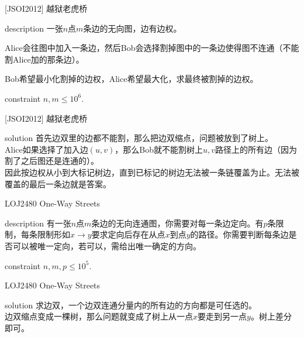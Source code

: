 \documentclass{beamer}
\def\le{\leqslant}
\begin{document}
\begin{frame}{[JSOI2012] 越狱老虎桥}
	\begin{block}{description}
		一张$n$点$m$条边的无向图，边有边权。
		
		Alice会往图中加入一条边，然后Bob会选择割掉图中的一条边使得图不连通（不能割Alice加的那条边）。
		
		Bob希望最小化割掉的边权，Alice希望最大化，求最终被割掉的边权。
	\end{block}
	\begin{block}{constraint}
		$n, m \le 10^6.$
	\end{block}
\end{frame}
\begin{frame}{[JSOI2012] 越狱老虎桥}
	\begin{block}{solution}
		首先边双里的边都不能割，那么把边双缩点，问题被放到了树上。\\
		
		Alice如果选择了加入边$(u, v)$，那么Bob就不能割树上$u, v$路径上的所有边（因为割了之后图还是连通的）。\\
		
		因此按边权从小到大标记树边，直到已标记的树边无法被一条链覆盖为止。无法被覆盖的最后一条边就是答案。
	\end{block}
\end{frame}

\begin{frame}{LOJ2480 One-Way Streets}
	\begin{block}{description}
		有一张$n$点$m$条边的无向连通图，你需要对每一条边定向。有$p$条限制，每条限制形如$x\to y$要求定向后存在从点$x$到点$y$的路径。你需要判断每条边是否可以被唯一定向，若可以，需给出唯一确定的方向。
	\end{block}
	\begin{block}{constraint}
		$n, m, p \le 10^5.$
	\end{block}
\end{frame}
\begin{frame}{LOJ2480 One-Way Streets}
	\begin{block}{solution}
		求边双，一个边双连通分量内的所有边的方向都是可任选的。\\
		
		边双缩点变成一棵树，那么问题就变成了树上从一点$x$要走到另一点$y$。树上差分即可。
	\end{block}
\end{frame}
\end{document}
